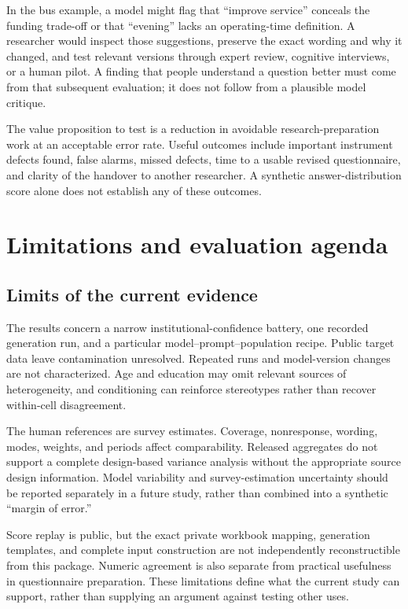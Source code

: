 \documentclass[
  11pt,
]{article}
\let\originalsection\section
\renewcommand{\section}{\Needspace{5\baselineskip}\originalsection}
\begin{document}
In the bus example, a model might flag that ``improve service'' conceals
the funding trade-off or that ``evening'' lacks an operating-time
definition. A researcher would inspect those suggestions, preserve the
exact wording and why it changed, and test relevant versions through
expert review, cognitive interviews, or a human pilot. A finding that
people understand a question better must come from that subsequent
evaluation; it does not follow from a plausible model critique.

The value proposition to test is a reduction in avoidable
research-preparation work at an acceptable error rate. Useful outcomes
include important instrument defects found, false alarms, missed
defects, time to a usable revised questionnaire, and clarity of the
handover to another researcher. A synthetic answer-distribution score
alone does not establish any of these outcomes.

\section{Limitations and evaluation
agenda}\label{limitations-and-evaluation-agenda}

\subsection{Limits of the current
evidence}\label{limits-of-the-current-evidence}

The results concern a narrow institutional-confidence battery, one
recorded generation run, and a particular model--prompt--population
recipe. Public target data leave contamination unresolved. Repeated runs
and model-version changes are not characterized. Age and education may
omit relevant sources of heterogeneity, and conditioning can reinforce
stereotypes rather than recover within-cell disagreement.

The human references are survey estimates. Coverage, nonresponse,
wording, modes, weights, and periods affect comparability. Released
aggregates do not support a complete design-based variance analysis
without the appropriate source design information. Model variability and
survey-estimation uncertainty should be reported separately in a future
study, rather than combined into a synthetic ``margin of error.''

Score replay is public, but the exact private workbook mapping,
generation templates, and complete input construction are not
independently reconstructible from this package. Numeric agreement is
also separate from practical usefulness in questionnaire preparation.
These limitations define what the current study can support, rather than
supplying an argument against testing other uses.
\end{document}
